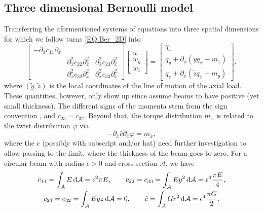 \documentclass[a4paper, english, 12pt, reqno, draft]{amsart}
\theoremstyle{definition}
\theoremstyle{remark}
\numberwithin{equation}{section}
\newcommand{\longDef}{\ensuremath{u}}
\newcommand{\crossDef}{\ensuremath{w}}
\newcommand{\torsion}{\ensuremath{\varphi}}
\newcommand{\force}{\ensuremath{q}}
\newcommand{\momentum}{\ensuremath{m}}
\newcommand{\crossSect}{\ensuremath{\mathcal A}}
\begin{document}
\subsection{Three dimensional Bernoulli model}\label{SEC:3d_Ber}
% 
Transferring the aformentioned systems of equations into three spatial dimensions for which we follow \cite[Sect.~6.1--6.4]{BauchauC2009} turns \eqref{EQ:Ber_2D} into
% 
\begin{equation}\label{EQ:Ber_3D}
 \begin{bmatrix}
  -\partial_{\bar x} c_{11} \partial_{\bar x} & & \\
  & \partial^2_{\bar x} c_{22} \partial^2_{\bar x} & \partial^2_{\bar x} c_{23} \partial^2_{\bar x} \\
  & \partial^2_{\bar x} c_{32} \partial^2_{\bar x} & \partial^2_{\bar x} c_{33} \partial^2_{\bar x}
 \end{bmatrix}
 \begin{bmatrix}
  \longDef \\ \crossDef_{\bar y} \\ \crossDef_{\bar z}
 \end{bmatrix}
 =
 \begin{bmatrix}
  \force_{\bar x} \\ \force_{\bar y} + \partial_{\bar x} ( \tilde y \force_{\bar x} - \momentum_{\bar z} ) \\ \force_{\bar z} + \partial_{\bar x} ( \tilde z \force_{\bar x} + \momentum_{\bar y} )
 \end{bmatrix},
\end{equation}
% 
where $(\tilde y, \tilde z)$ is the local coordinates of the line of motion of the axial load. These quantities, however, only show up since \cite[Sect.~5--8]{BauchauC2009} assume beams to have positive (yet small thickness). The different signs of the momenta stem from the sign convention \cite[Sect.~5.2]{BauchauC2009}, and $c_{23} = c_{32}$. Beyond that, the torque distribution $\momentum_{\bar x}$ is related to the twist distribution $\torsion$ via
% 
\begin{equation}
 -\partial_{\bar x} \hat c \partial_{\bar x} \torsion = \momentum_{\bar x},
\end{equation}
% 
where the $c$ (possibly with subscript and/or hat) need further investigation to allow passing to the limit, where the thickness of the beam goes to zero. For a circular beam with radius $\epsilon > 0$ and cross section $\crossSect$, we have
% 
\begin{gather*}
 c_{11} = \int_\crossSect E \, \textup d\crossSect = \epsilon^2 \pi E, \qquad c_{22} = c_{33} = \int_\crossSect E y^2 \, \textup d\crossSect = \epsilon^4 \frac{\pi E}{4}, \\
 c_{23} = c_{32} = \int_\crossSect E y z \, \textup d\crossSect = 0, \qquad \hat c = \int_\crossSect G r^2 \, \textup d \crossSect = \epsilon^4 \frac{\pi G}{2}.
\end{gather*}
\end{document}
